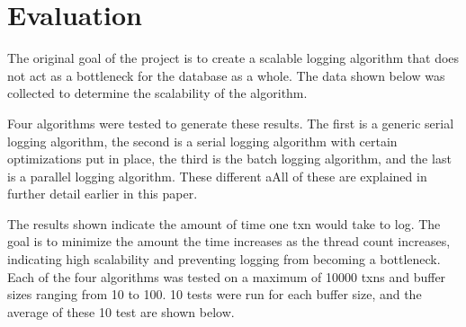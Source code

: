 \section{Evaluation}


The original goal of the project is to create a scalable logging algorithm that does not act as a bottleneck for the database as a whole. The data shown below was collected to determine the scalability of the algorithm. 

Four algorithms were tested to generate these results. The first is a generic serial logging algorithm, the second is a serial logging algorithm with certain optimizations put in place, the third is the batch logging algorithm, and the last is a parallel logging algorithm. These different aAll of these are explained in further detail earlier in this paper. \newline

The results shown indicate the amount of time one txn would take to log. The goal is to minimize the amount the time increases as the thread count increases, indicating high scalability and preventing logging from becoming a bottleneck. Each of the four algorithms was tested on a maximum of 10000 txns and buffer sizes ranging from 10 to 100. 10 tests were run for each buffer size, and the average of these 10 test are shown below. \newline 

